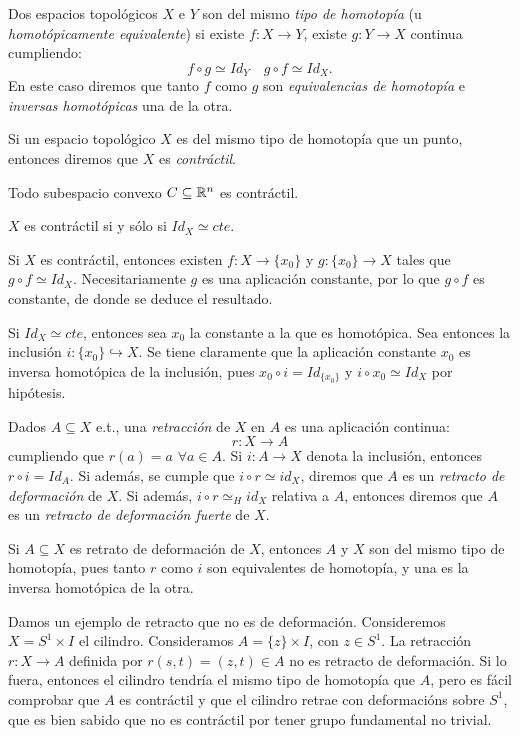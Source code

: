 \documentclass[HS.tex]{subfiles}
\begin{document}
\begin{defi}
Dos espacios topológicos $X$ e $Y$ son del mismo \emph{tipo de homotopía} (u \emph{homotópicamente equivalente}) si existe $f \colon X \to Y$, existe $g \colon Y \to X$ continua cumpliendo:
\[ f \circ g \simeq Id_Y \quad g \circ f \simeq Id_X. \]
En este caso diremos que tanto $f$ como $g$ son \emph{equivalencias de homotopía} e \emph{inversas homotópicas} una de la otra.
\end{defi}

\begin{defi}
Si un espacio topológico $X$ es del mismo tipo de homotopía que un punto, entonces diremos que $X$ es \emph{contráctil}.
\end{defi}
\begin{ej}
Todo subespacio convexo $C \subseteq \mathbb{R}^n$ es contráctil.
\end{ej}
\begin{prop}
$X$ es contráctil si y sólo si $Id_X \simeq cte$.
\end{prop}
\begin{dem}
Si $X$ es contráctil, entonces existen $f:X\to \{x_0\}$ y $g:\{x_0\}\to X$ tales que $g\circ f\simeq Id_X$. Necesitariamente $g$ es una aplicación constante, por lo que $g\circ f$ es constante, de donde se deduce el resultado.

Si $Id_X \simeq cte$, entonces sea $x_0$ la constante a la que es homotópica. Sea entonces la inclusión $i:\{x_0\}\hookrightarrow X$. Se tiene claramente que la aplicación constante $x_0$ es inversa homotópica de la inclusión, pues $x_0\circ i=Id_{\{x_0\}}$ y $i\circ x_0\simeq Id_X$ por hipótesis. \QED
\end{dem}

\begin{defi}
Dados $A \subseteq X$ e.t., una \emph{retracción} de $X$ en $A$ es una aplicación continua:
\[ r \colon X \to A \]
cumpliendo que $r(a) = a$ $\forall a \in A$.
Si $i \colon A \to X$ denota la inclusión, entonces $r \circ i = Id_A$.
Si además, se cumple que $i \circ r \simeq id_X$, diremos que $A$ es un \emph{retracto de deformación} de $X$.
Si además, $i \circ r \simeq_H id_X$ relativa a $A$, entonces diremos que $A$ es un \emph{retracto de deformación fuerte} de $X$.
\end{defi}

\begin{nota}
Si $A \subseteq X$ es retrato de deformación de $X$, entonces $A$ y $X$ son del mismo tipo de homotopía, pues tanto $r$ como $i$ son equivalentes de homotopía, y una es la inversa homotópica de la otra.
\end{nota}
\begin{ej}
Damos un ejemplo de retracto que no es de deformación.
Consideremos $X = S^1 \times I$ el cilindro. Consideramos $A = \{z\} \times I$, con $z \in S^1$.
La retracción $r \colon X \to A$ definida por $r(s,t) = (z,t) \in A$ no es retracto de deformación. Si lo fuera, entonces el cilindro tendría el mismo tipo de homotopía que $A$, pero es fácil comprobar que $A$ es contráctil y que el cilindro retrae con deformacións sobre $S^1$, que es bien sabido que no es contráctil por tener grupo fundamental no trivial.
\end{ej}
\end{document}
